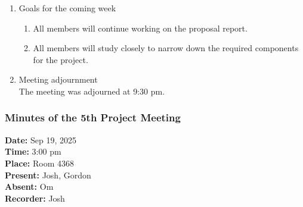 \documentclass[12pt,a4paper]{article}
\begin{document}
\begin{enumerate}
\begin{enumerate}
\end{enumerate}
\item Goals for the coming week
\begin{enumerate}
\item All members will continue working on the proposal report.\\
\item All members will study closely to narrow down the required components for the project.\\
\end{enumerate}
\item Meeting adjournment\\
The meeting was adjourned at 9:30 pm.
\end{enumerate}

\subsubsection{Minutes of the 5th Project Meeting}
\textbf{Date:} Sep 19, 2025\\
\textbf{Time:} 3:00 pm\\
\textbf{Place:} Room 4368\\
\textbf{Present:} Josh, Gordon\\
\textbf{Absent:} Om\\
\textbf{Recorder:} Josh
\end{document}
